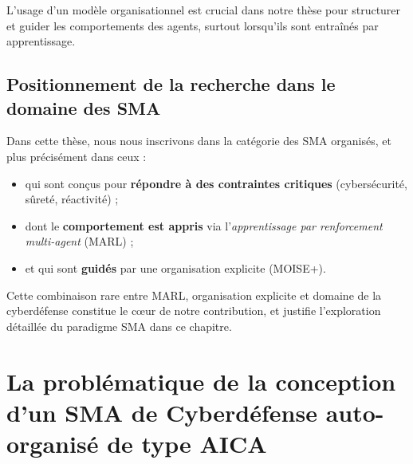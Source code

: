 \documentclass[ twoside,openright,titlepage,numbers=noenddot,headinclude,%
                footinclude=true,cleardoublepage=empty,abstractoff, %
                BCOR=5mm,paper=a4,fontsize=11pt,%
                french,american,%
                ]{scrreprt}
\begin{document}
L’usage d’un modèle organisationnel est crucial dans notre thèse pour structurer et guider les comportements des agents, surtout lorsqu’ils sont entraînés par apprentissage.

\vspace{0.5em}
\subsection*{Positionnement de la recherche dans le domaine des SMA}

Dans cette thèse, nous nous inscrivons dans la catégorie des SMA organisés, et plus précisément dans ceux :
\begin{itemize}
    \item qui sont conçus pour \textbf{répondre à des contraintes critiques} (cybersécurité, sûreté, réactivité) ;
    \item dont le \textbf{comportement est appris} via l’\textit{apprentissage par renforcement multi-agent} (MARL) ;
    \item et qui sont \textbf{guidés} par une organisation explicite (MOISE+).
\end{itemize}

Cette combinaison rare entre MARL, organisation explicite et domaine de la cyberdéfense constitue le cœur de notre contribution, et justifie l’exploration détaillée du paradigme SMA dans ce chapitre.



\section{La problématique de la conception d'un SMA de Cyberdéfense auto-organisé de type AICA}\label{sec:problematique-sma-aica}
\end{document}
